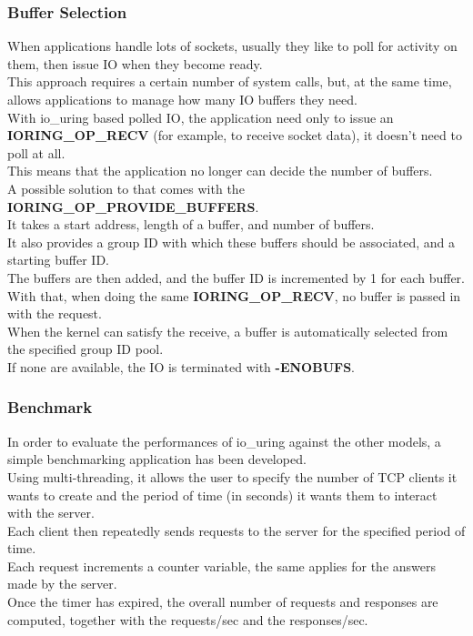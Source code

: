 \subsubsection{Buffer Selection}
When applications handle lots of sockets, usually they like to poll for activity on them, then issue IO when they become ready. \\
This approach requires a certain number of system calls, but, at the same time, allows applications to manage how many IO buffers they need. \\
With io\_uring based polled IO, the application need only to issue an \textbf{IORING\_OP\_RECV} (for example, to receive socket data), it doesn't need to poll at all. \\
This means that the application no longer can decide the number of buffers. \\
A possible solution to that comes with the \textbf{IORING\_OP\_PROVIDE\_BUFFERS}. \\
It takes a start address, length of a buffer, and number of buffers. \\
It also provides a group ID with which these buffers should be associated, and a starting buffer ID. \\
The buffers are then added, and the buffer ID is incremented by 1 for each buffer.\\
With that, when doing the same \textbf{IORING\_OP\_RECV}, no buffer is passed in
with the request. \\
When the kernel can satisfy the receive, a buffer is automatically selected from the specified group ID pool. \\
If none are available, the IO is terminated with \textbf{-ENOBUFS}. 


\subsubsection{Benchmark}

In order to evaluate the performances of io\_uring against the other models, a simple benchmarking application has been developed. \\
Using multi-threading, it allows the user to specify the number of TCP clients it wants to create and the period of time (in seconds) it wants them to interact with the server. \\
Each client then repeatedly sends requests to the server for the specified period of time. \\
Each request increments a counter variable, the same applies for the answers made by the server. \\
Once the timer has expired, the overall number of requests and responses are computed, together with the requests/sec and the responses/sec.


